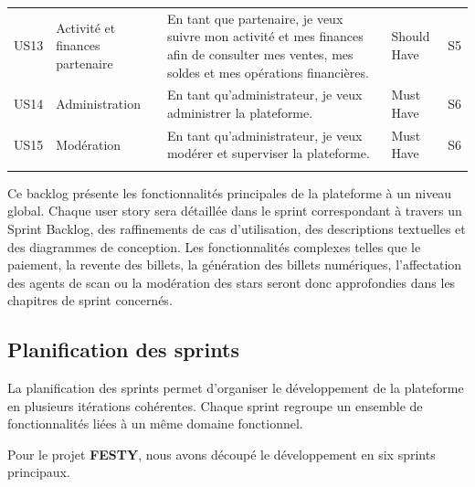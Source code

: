 \begin{table}[H]
\begin{tabular}{p{0.9cm} p{2.6cm} p{7.2cm} p{1.8cm} p{1.4cm}}
US13 & Activité et finances partenaire & En tant que partenaire, je veux suivre mon activité et mes finances afin de consulter mes ventes, mes soldes et mes opérations financières. & Should Have & S5 \\ \lightrule
US14 & Administration & En tant qu’administrateur, je veux administrer la plateforme. & Must Have & S6 \\ \lightrule
US15 & Modération & En tant qu’administrateur, je veux modérer et superviser la plateforme. & Must Have & S6 \\ \lightrule
\bottomrule
\end{tabular}
\normalsize
\end{table}

Ce backlog présente les fonctionnalités principales de la plateforme à un niveau global. Chaque user story sera détaillée dans le sprint correspondant à travers un Sprint Backlog, des raffinements de cas d'utilisation, des descriptions textuelles et des diagrammes de conception. Les fonctionnalités complexes telles que le paiement, la revente des billets, la génération des billets numériques, l'affectation des agents de scan ou la modération des stars seront donc approfondies dans les chapitres de sprint concernés.

\subsection{Planification des sprints}
La planification des sprints permet d'organiser le développement de la plateforme en plusieurs itérations cohérentes. Chaque sprint regroupe un ensemble de fonctionnalités liées à un même domaine fonctionnel.

Pour le projet \textbf{FESTY}, nous avons découpé le développement en six sprints principaux.

